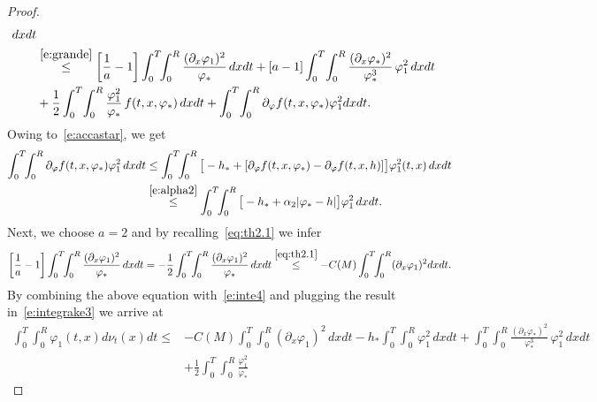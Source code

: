 \documentclass[11pt,leqno]{amsart}
\numberwithin{equation}{section}
\begin{document}
\begin{proof}
\begin{equation}
\begin{split}
    dx dt
    \\
    & \stackrel{\eqref{e:grande}}{\leq} \left[ \frac{1}{a} -1 \right]
    \int_0^T \! \! \int_0^R \frac{( {\partial_x } {\varphi}_1)^2}{{\varphi}_\ast} \, dx dt
    + [a-1] \int_0^T \!  \int_0^R \frac{( {\partial_x } {\varphi}_\ast)^2
    }{{\varphi}^3_\ast} \, {\varphi}_1^2 \, dx dt
    \\
    & + \frac{1}{2} \int_0^T \!
    \int_0^R \frac{{\varphi}_1^2 }{{\varphi}_\ast} \, f(t, x, {\varphi}_\ast)
    \, dx dt + \int_0^T \!  \int_0^R {\partial}_{\varphi}
    f(t,x,{\varphi}_\ast){\varphi}_1^2
    dx dt .
  \end{split}
\end{equation}
Owing to~\eqref{e:accastar}, we get
\begin{equation}
\label{e:inte4}
\begin{split}
 \int_0^T \! \!
\int_0^R 
{\partial}_{\varphi} f(t,x,{\varphi}_\ast){\varphi}_1^2 \, dx dt  & \leq  \int_0^T \! \!
\int_0^R
\big[ - h_\ast + [{\partial}_{\varphi} f (t,x,{\varphi}_\ast) -{\partial}_{\varphi} f(t,x,h) ]
\big]
 {\varphi}_1^2 (t, x)
 \, dx dt \\
 & \stackrel{\eqref{e:alpha2}}{\leq} \int_0^T \! \!
\int_0^R
\big[ - h_\ast + \alpha_2 |{\varphi}_\ast - h|
\big]
 {\varphi}_1^2
 \, dx  dt. \\
\end{split}
\end{equation}
Next, we choose $a=2$ and by recalling~\eqref{eq:th2.1} we infer 
$$
    \left[ \frac{1}{a} -1 \right] \int_0^T  \! \! \int_0^R    \frac{( {\partial_x } {\varphi}_1)^2}{{\varphi}_\ast} \, dx dt
    = -\frac{1}{2}
   \int_0^T  \! \! \int_0^R    \frac{( {\partial_x } {\varphi}_1)^2}{{\varphi}_\ast} \, dx dt 
        \stackrel{\eqref{eq:th2.1}}{\leq}
        - C(M)
          \int_0^T  \! \! \int_0^R 
        ( {\partial_x } {\varphi}_1)^2 dx dt. 
$$
By combining the above equation with~\eqref{e:inte4} and plugging the result in~\eqref{e:integrake3} we arrive at 
\begin{equation}
  \label{e:coercivita}
  \begin{split}
    \int_0^T \! \! \int_0^R \!\!{\varphi}_1(t,x) d\nu_t(x)dt \leq & - C(M)\!
    \int_0^T \! \! \int_0^R \!\!( {\partial_x } {\varphi}_1)^2 \, dx dt - h_\ast\! \int_0^T
    \! \! \int_0^R \!\!{\varphi}_1^2 \, dx dt +\! \int_0^T \!  \int_0^R \!\!\frac{(
      {\partial_x } {\varphi}_\ast)^2 }{{\varphi}^3_\ast} \, {\varphi}_1^2 \, dx dt
    \\
    &+
    \frac{1}{2} \int_0^T \!  \int_0^R \frac{{\varphi}_1^2 }{{\varphi}_\ast} \,

\end{split}
\end{equation}
\end{proof}
\end{document}
